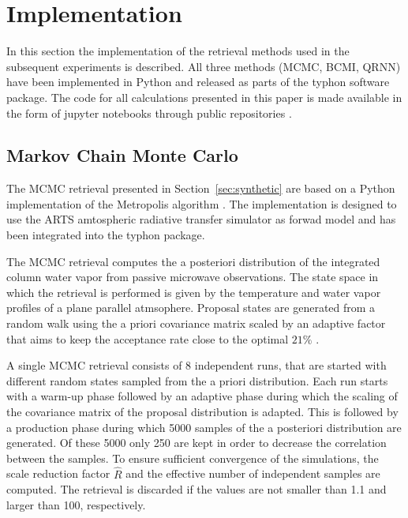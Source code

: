 \documentclass[journal abbreviation, manuscript]{copernicus}
\begin{document}
\section{Implementation}
\label{sec:implementation}

  In this section the implementation of the retrieval methods used in the
  subsequent experiments is described. All three methods (MCMC, BCMI, QRNN) have
  been implemented in Python \citep{python} and released as parts of the typhon
  \citep{typhon} software package. The code for all calculations presented in
  this paper is made available in the form of jupyter notebooks through public
  repositories \citep{predictive_uncertainty, smhi}.

\subsection{Markov Chain Monte Carlo}

   The MCMC retrieval presented in Section~\ref{sec:synthetic} are based on
   a Python implementation of the Metropolis algorithm \citep[Ch. 12]{bda}.
   The implementation is designed to use the ARTS amtospheric radiative
   transfer simulator \citep{arts_1, arts_2} as forwad model and has been
   integrated into the typhon package.

   The MCMC retrieval computes the a posteriori distribution of the integrated
   column water vapor from passive microwave observations. The state space in
   which the retrieval is performed is given by the temperature and water vapor
   profiles of a plane parallel atmsophere. Proposal states are generated from a
   random walk using the a priori covariance matrix scaled by an adaptive factor
   that aims to keep the acceptance rate close to the optimal $21\%$
   \citep{bda}.

   A single MCMC retrieval consists of 8 independent runs, that are started with
   different random states sampled from the a priori distribution. Each run
   starts with a warm-up phase followed by an adaptive phase during which the
   scaling of the covariance matrix of the proposal distribution is adapted. This is
   followed by a production phase during which 5000 samples of the a posteriori
   distribution are generated. Of these 5000 only 250 are kept in order to decrease
   the correlation between the samples. To ensure sufficient convergence of the
   simulations, the scale reduction factor $\hat{R}$ and the effective number of
   independent samples \citep[eqs. (11.12), (11.13)]{bda} are computed. The
   retrieval is discarded if the values are not smaller than 1.1 and larger than
   100, respectively.
   
\end{document}
